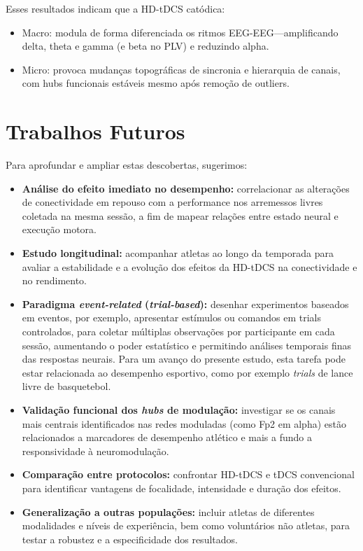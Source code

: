 Esses resultados indicam que a HD-tDCS catódica:
\begin{itemize}
  \item Macro: modula de forma diferenciada os ritmos EEG-EEG—amplificando delta, theta e gamma (e beta no PLV) e reduzindo alpha.
  \item Micro: provoca mudanças topográficas de sincronia e hierarquia de canais, com hubs funcionais estáveis mesmo após remoção de outliers.
\end{itemize}

\section{Trabalhos Futuros}
Para aprofundar e ampliar estas descobertas, sugerimos:
\begin{itemize}
  \item \textbf{Análise do efeito imediato no desempenho:} correlacionar as alterações de conectividade em repouso com a performance nos arremessos livres coletada na mesma sessão, a fim de mapear relações entre estado neural e execução motora.
  \item \textbf{Estudo longitudinal:} acompanhar atletas ao longo da temporada para avaliar a estabilidade e a evolução dos efeitos da HD-tDCS na conectividade e no rendimento.
  \item \textbf{Paradigma \textit{event-related} (\textit{trial-based}):} desenhar experimentos baseados em eventos, por exemplo, apresentar estímulos ou comandos em trials controlados, para coletar múltiplas observações por participante em cada sessão, aumentando o poder estatístico e permitindo análises temporais finas das respostas neurais. Para um avanço do presente estudo, esta tarefa pode estar relacionada ao desempenho esportivo, como por exemplo \textit{trials} de lance livre de basquetebol.
  \item \textbf{Validação funcional dos \textit{hubs} de modulação:} investigar se os canais mais centrais identificados nas redes moduladas (como Fp2 em alpha) estão relacionados a marcadores de desempenho atlético e mais a fundo a responsividade à neuromodulação.
  \item \textbf{Comparação entre protocolos:} confrontar HD-tDCS e tDCS convencional para identificar vantagens de focalidade, intensidade e duração dos efeitos.
  \item \textbf{Generalização a outras populações:} incluir atletas de diferentes modalidades e níveis de experiência, bem como voluntários não atletas, para testar a robustez e a especificidade dos resultados.

\end{itemize}
